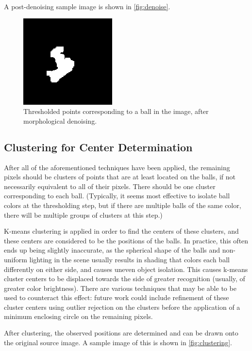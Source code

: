 \documentclass[letterpaper, 10 pt, conference]{ieeeconf}  %
\begin{document}
A post-denoising sample image is shown in \ref{fig:denoise}.

\begin{figure}
\centering
    \includegraphics{denoised.png}
    \caption{Thresholded points corresponding to a ball in the image, after morphological denoising.}
    \label{fig:denoised}
\end{figure}

\subsection{Clustering for Center Determination}

After all of the aforementioned techniques have been applied, the remaining pixels should be clusters of points that are at least located on the balls, if not necessarily equivalent to all of their pixels. There should be one cluster corresponding to each ball. (Typically, it seems most effective to isolate ball colors at the thresholding step, but if there are multiple balls of the same color, there will be multiple groups of clusters at this step.)

K-means clustering is applied in order to find the centers of these clusters, and these centers are considered to be the positions of the balls. In practice, this often ends up being slightly inaccurate, as the spherical shape of the balls and non-uniform lighting in the scene usually results in shading that colors each ball differently on either side, and causes uneven object isolation. This causes k-means cluster centers to be displaced towards the side of greater recognition (usually, of greater color brightness). There are various techniques that may be able to be used to counteract this effect: future work could include refinement of these cluster centers using outlier rejection on the clusters before the application of a minimum enclosing circle on the remaining pixels.

After clustering, the observed positions are determined and can be drawn onto the original source image. A sample image of this is shown in \ref{fig:clustering}.
\end{document}
